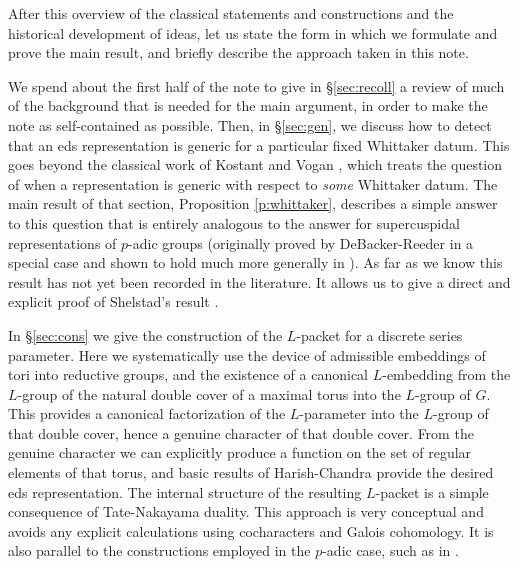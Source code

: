 \documentclass{article}
\theoremstyle{definition}
\numberwithin{equation}{section}
\renewcommand{\-}{\hyp{}}
\begin{document}
After this overview of the classical statements and constructions and the historical development of ideas, let us state the form in which we formulate and prove the main result, and briefly describe the approach taken in this note. 

We spend about the first half of the note to give in \S\ref{sec:recoll} a review of much of the background that is needed for the main argument, in order to make the note as self-contained as possible. Then, in \S\ref{sec:gen}, we discuss how to detect that an eds representation is generic for a particular fixed Whittaker datum. This goes beyond the classical work of Kostant \cite{Kos78} and Vogan \cite{Vog78}, which treats the question of when a representation is generic with respect to \emph{some} Whittaker datum. The main result of that section, Proposition \ref{p:whittaker}, describes a simple answer to this question that is entirely analogous to the answer for supercuspidal representations of $p$-adic groups (originally proved by DeBacker-Reeder in a special case \cite{DR10} and shown to hold much more generally in \cite[Lemma 6.2.2]{KalRSP}). As far as we know this result has not yet been recorded in the literature. It allows us to give a direct and explicit proof of Shelstad's result \cite[Theorem 11.5]{SheTE3}.

In \S\ref{sec:cons} we give the construction of the $L$\-packet for a discrete series parameter. Here we systematically use the device of admissible embeddings of tori into reductive groups, and the existence of a canonical $L$\-embedding from the $L$\-group of the natural double cover of a maximal torus into the $L$\-group of $G$. This provides a canonical factorization of the $L$\-parameter into the $L$\-group of that double cover, hence a genuine character of that double cover. From the genuine character we can explicitly produce a function on the set of regular elements of that torus, and basic results of Harish-Chandra provide the desired eds representation. The internal structure of the resulting $L$\-packet is a simple consequence of Tate-Nakayama duality. This approach is very conceptual and avoids any explicit calculations using cocharacters and Galois cohomology. It is also parallel to the constructions employed in the $p$-adic case, such as in \cite{KalRSP}.
\end{document}
